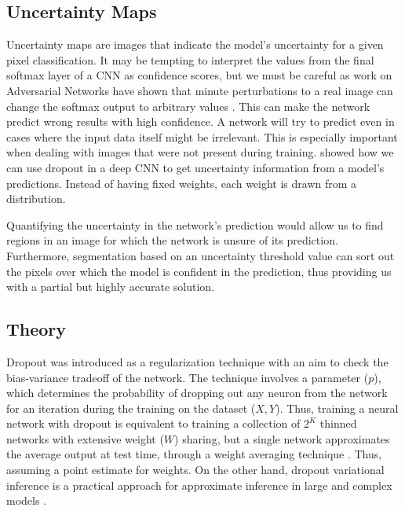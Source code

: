 \subsection{Uncertainty Maps}

Uncertainty maps are images that indicate the model's uncertainty for a given pixel classification. It may be tempting to interpret the values from the final softmax layer of a CNN as confidence scores, but we must be careful as work on Adversarial Networks have shown that minute perturbations to a real image can change the softmax output to arbitrary values \parencite{goodfellow2014explaining}. This can make the network predict wrong results with high confidence. A network will try to predict even in cases where the input data itself might be irrelevant. This is especially important when dealing with images that were not present during training. \parencite{gal2016dropout} showed how we can use dropout in a deep CNN to get uncertainty information from a model’s predictions. Instead of having fixed weights, each weight is drawn from a distribution.

Quantifying the uncertainty in the network’s prediction would allow us to find regions in an image for which the network is unsure of its prediction. Furthermore, segmentation based on an uncertainty threshold value can sort out the pixels over which the model is confident in the prediction, thus providing us with a partial but highly accurate solution.

\subsection{Theory} \label{section:CNN_MC_theory}

Dropout \parencite{srivastava2014dropout} was introduced as a regularization technique with an aim to check the bias-variance tradeoff of the network. The technique involves a parameter ($p$), which determines the probability of dropping out any neuron from the network for an iteration during the training on the dataset ($X,Y$). Thus, training a neural network with dropout is equivalent to training a collection of $2^K$ thinned networks with extensive weight ($W$) sharing, but a single network approximates the average output at test time, through a weight averaging technique \parencite{badrinarayanan2015segnet}. Thus, assuming a point estimate for weights. On the other hand, dropout variational inference is a practical approach for approximate inference in large and complex models \parencite{kendall2015bayesian}. 


